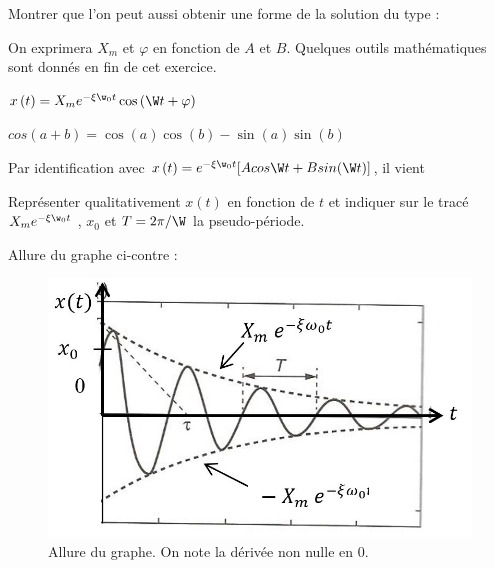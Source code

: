\documentclass[a4paper, 10pt, garamond]{book}
\begin{document}
\QR
{Montrer que l’on peut aussi obtenir une forme de la solution du type :

                                                                   
\noindent                                                                  
On exprimera $X_m$ et $\varphi$ en fonction de $A$ et $B$. Quelques outils mathématiques sont donnés en fin de cet exercice. }
{
 {$x\left(t\right)=X_me^{-\xi\w_0t}\cos{(}\W t+\varphi)$}

 {$cos\left(a+b\right)=\cos{\left(a\right)}\cos{\left(b\right)}-\sin{\left(a\right)}\sin(b)$}



Par identification avec $x\left(t\right)=e^{-\xi\w_0t}[Acos\W t+Bsin(\W t)]$, il vient		 


	


}

\QR
{Représenter qualitativement $x\left(t\right)$ en fonction de $t$ et indiquer sur le tracé $X_m e^{-\xi\w_0t}$ , $x_0$ et $T={2\pi}/{\W}$ la pseudo-période.}
{
Allure du graphe ci-contre : 

\begin{figure}[htbp!]
  \centering
  \includegraphics[width=.6\linewidth]{P1corr.jpg}
  \caption{Allure du graphe. On note la dérivée non nulle en 0.}
  \label{fig:P1corr}
\end{figure}

}
\end{document}
